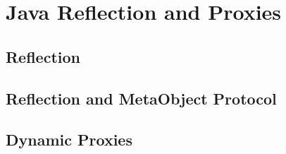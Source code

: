 \section{Java Reflection and Proxies}\label{Java Reflection and Proxies}

\subsection{Reflection}\label{Reflection}

\subsection{Reflection and Meta­Object Protocol}\label{Reflection and Meta­Object Protocol}

\subsection{Dynamic Proxies}\label{Dynamic Proxies}
